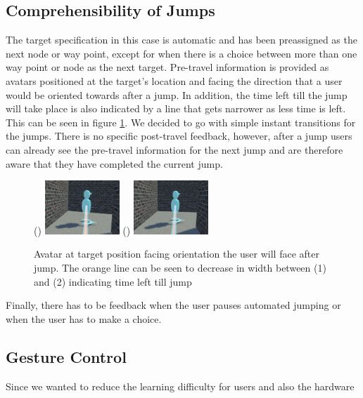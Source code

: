 \subsection{Comprehensibility of Jumps}
\label{subsection AGJ AJ: Comprehensibility of Jumps}
The target specification in this case is automatic and has been preassigned as the next node or way point, except for when there is a choice between more than one way point or node as the next target. Pre-travel information is provided as avatars positioned at the target's location and facing the direction that a user would be oriented towards after a jump. In addition, the time left till the jump will take place is also indicated by a line that gets narrower as less time is left. This can be seen in figure \ref{fig:automated-jumping-feedback}. We decided to go with simple instant transitions for the jumps. There is no specific post-travel feedback, however, after a jump users can already see the pre-travel information for the next jump and are therefore aware that they have completed the current jump. 

\begin{figure}[]
	\centering
	() {\includegraphics[width=0.25\textwidth]{images/automated-jumping-feedback-1.pdf}}
	() {\includegraphics[width=0.25\textwidth]{images/automated-jumping-feedback-2.pdf}} 
	\caption{Avatar at target position facing orientation the user will face after jump. The orange line can be seen to decrease in width between (1) and (2) indicating time left till jump}
	\label{fig:automated-jumping-feedback}
\end{figure}  

Finally, there has to be feedback when the user pauses automated jumping or when the user has to make a choice.

\subsection{Gesture Control}
\label{subsection AGJ AJ: Gesture Control}
Since we wanted to reduce the learning difficulty for users and also the hardware 